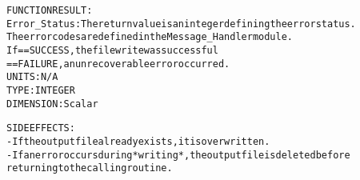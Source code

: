 \begin{alltt}
  FUNCTION RESULT:
        Error_Status: The return value is an integer defining the error status.
                      The error codes are defined in the Message_Handler module.
                      If == SUCCESS, the file write was successful
                         == FAILURE, an unrecoverable error occurred.
                      UNITS:      N/A
                      TYPE:       INTEGER
                      DIMENSION:  Scalar
 
  SIDE EFFECTS:
        - If the output file already exists, it is overwritten.
        - If an error occurs during *writing*, the output file is deleted before
          returning to the calling routine.
 
  \end{alltt}
